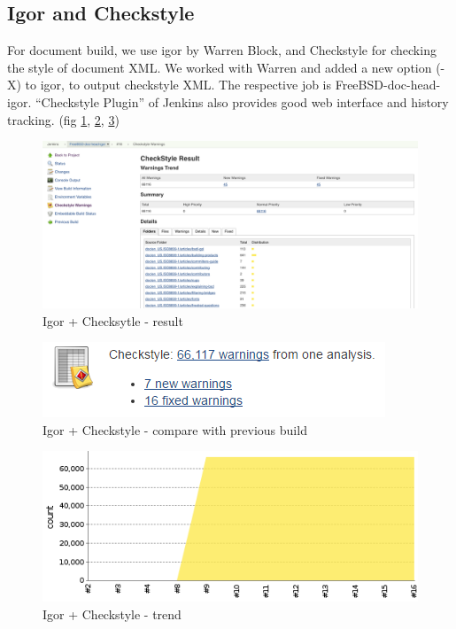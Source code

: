 \documentclass[a4paper,twocolumn,10pt]{article}
\begin{document}
\subsection{Igor and Checkstyle}

For document build, we use igor \cite{igor} by Warren Block, and Checkstyle
\cite{checkstyle} for checking the style of document XML. We worked with Warren
and added a new option (-X) to igor, to output checkstyle XML. The respective
job is FreeBSD-doc-head-igor.  ``Checkstyle Plugin''
\cite{jenkins-checkstyle-plugin} of Jenkins also provides good web interface
and history tracking. (fig \ref{checkstyle-result}, \ref{checkstyle-compare},
\ref{checkstyle-trend})

\begin{figure}
\includegraphics[width=\textwidth]{checkstyle-result.png}
\caption{Igor + Checksytle - result}
\label{checkstyle-result}
\end{figure}

\begin{figure}
\includegraphics{checkstyle-compare.png}
\caption{Igor + Checkstyle - compare with previous build}
\label{checkstyle-compare}
\end{figure}

\begin{figure}
\includegraphics{checkstyle-trend.png}
\caption{Igor + Checkstyle - trend}
\label{checkstyle-trend}
\end{figure}
\end{document}
